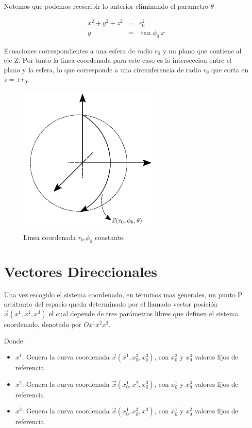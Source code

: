 \documentclass[12pt]{report}
\begin{document}
Notemos que podemos reescribir lo anterior eliminando el parametro $\theta$

\begin{eqnarray} \label{2.20}
x^2 + y^2 + z^2 &=& r_0^2 \\
y &=&\tan{\phi_0} \ x \label{2.21}
\end{eqnarray}

Ecuaciones correspondientes a una esfera de radio $r_0$ y un plano que contiene al eje Z. Por tanto la linea coordenada para este caso es la interseccion entre el plano y la esfera, lo que corresponde a una circunferencia de radio $r_0$ que corta en $z=\pm r_0$.
 
 \begin{figure}
	\centering
	\includegraphics[width=7cm]{figura51.png}
	\caption{ Linea coordenada $r_0$,$\phi_0$ constante.}
	\label{fig.1}
\end{figure}
 





\section{Vectores Direccionales}


Una vez escogido el sistema coordenado, en términos mas generales, un punto P arbitrario del espacio queda determinado por el llamado vector posición $\displaystyle\vec{x}(x^1,x^2,x^3)$ el cual depende de tres parámetros libres que definen el sistema coordenado, denotado por $Ox^1x^2x^3$.

Donde:

\begin{itemize}
\item $x^1$: Genera la curva coordenada $\vec{x}(x^1,x_0^2,x_0^3)$, con $x_0^2$ y $x_0^3$ valores fijos de referencia.
\item $x^2$: Genera la curva coordenada $\vec{x}(x_0^1,x^2,x_0^3)$, con $x_0^1$ y $x_0^3$ valores fijos de referencia. 
\item $x^3$: Genera la curva coordenada $\vec{x}(x_0^1,x_0^2,x^3)$, con $x_0^1$ y $x_0^2$ valores fijos de referencia. 
\end{itemize}
\end{document}
